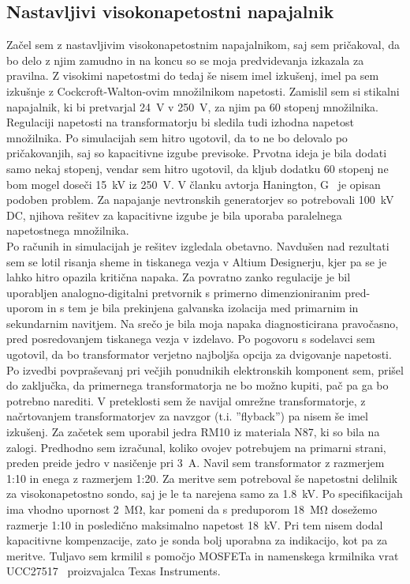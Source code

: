 \documentclass[a4paper,twoside,openright,12pt,Slovene]{book}
\begin{document}
	\subsection{Nastavljivi visokonapetostni napajalnik}
	Začel sem z nastavljivim visokonapetostnim napajalnikom, saj sem pričakoval, da bo delo z njim zamudno in na koncu so se moja predvidevanja izkazala za pravilna. Z visokimi napetostmi do tedaj še nisem imel izkušenj, imel pa sem izkušnje z Cockcroft-Walton-ovim množilnikom napetosti. Zamislil sem si stikalni napajalnik, ki bi pretvarjal \SI{24}{\volt} v \SI{250}{\volt}, za njim pa 60 stopenj množilnika. Regulaciji napetosti na transformatorju bi sledila tudi izhodna napetost množilnika. Po simulacijah sem hitro ugotovil, da to ne bo delovalo po pričakovanjih, saj so kapacitivne izgube previsoke. Prvotna ideja je bila dodati samo nekaj stopenj, vendar sem hitro ugotovil, da kljub dodatku 60 stopenj ne bom mogel doseči \SI{15}{\kilo\volt} iz \SI{250}{\volt}. V članku avtorja Hanington, G~\cite{ParallelHighVoltageMultipliers} je opisan podoben problem. Za napajanje nevtronskih generatorjev so potrebovali \SI{100}{\kilo\volt} DC, njihova rešitev za kapacitivne izgube je bila uporaba paralelnega napetostnega množilnika. 
~\\Po računih in simulacijah je rešitev izgledala obetavno. Navdušen nad rezultati sem se lotil risanja sheme in tiskanega vezja v Altium Designerju, kjer pa se je lahko hitro opazila kritična napaka. Za povratno zanko regulacije je bil uporabljen analogno-digitalni pretvornik s primerno dimenzioniranim pred-uporom in s tem je bila prekinjena galvanska izolacija med primarnim in sekundarnim navitjem. Na srečo je bila moja napaka diagnosticirana pravočasno, pred posredovanjem tiskanega vezja v izdelavo. Po pogovoru s sodelavci sem ugotovil, da bo transformator verjetno najboljša opcija za dvigovanje napetosti. Po izvedbi povpraševanj pri večjih ponudnikih elektronskih komponent sem, prišel do zaključka, da primernega transformatorja ne bo možno kupiti, pač pa ga bo potrebno narediti. V preteklosti sem že navijal omrežne transformatorje, z načrtovanjem transformatorjev za navzgor (t.i. ''flyback'') pa nisem še imel izkušenj. Za začetek sem uporabil jedra RM10 iz materiala N87, ki so bila na zalogi. Predhodno sem izračunal, koliko ovojev potrebujem na primarni strani, preden preide jedro v nasičenje pri \SI{3}{\ampere}. Navil sem transformator z razmerjem 1:10 in enega z razmerjem 1:20.
Za meritve sem potreboval še napetostni delilnik za visokonapetostno sondo, saj je le ta narejena samo za \SI{1,8}{\kilo\volt}. Po specifikacijah ima vhodno upornost \SI{2}{\mega\ohm}, kar pomeni da s preduporom \SI{18}{\mega\ohm} dosežemo razmerje 1:10 in posledično maksimalno napetost \SI{18}{\kilo\volt}. Pri tem nisem dodal kapacitivne kompenzacije, zato je sonda bolj uporabna za indikacijo, kot pa za meritve. Tuljavo sem krmilil s pomočjo MOSFETa in namenskega krmilnika vrat UCC27517~\cite{TI:UCC27517} proizvajalca Texas Instruments. 
\end{document}
